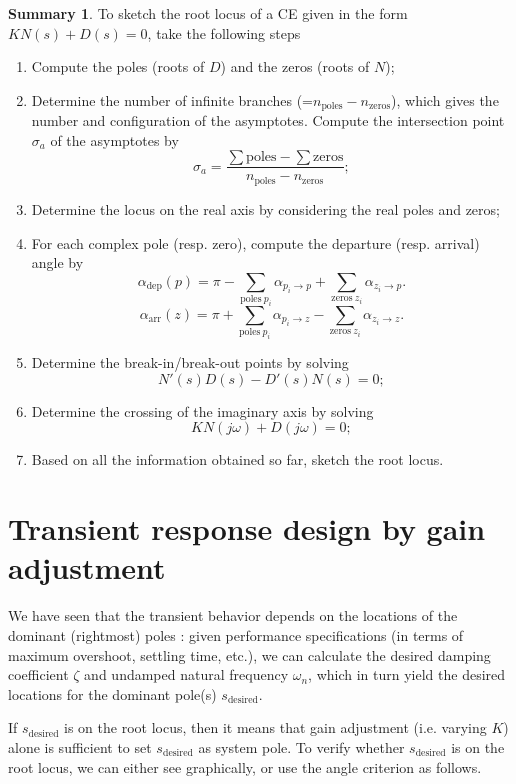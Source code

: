 \documentclass[a4paper,11pt]{report}
\theoremstyle{definition}
\newcommand{\des}{\textrm{desired}}
\newtheorem{mdsummary}{Summary}
\newenvironment{summary}%
  {\vspace{0.1cm}\begin{mdframed}[linecolor=red!60!black,
  linewidth=2pt]\begin{mdsummary}}%
  {\end{mdsummary}\end{mdframed}\vspace{0.1cm}}
\begin{document}
\begin{summary}
  To sketch the root locus of a CE given in the form $KN(s) + D(s) = 0$,
  take the following steps
  \begin{enumerate}
  \item Compute the poles (roots of $D$) and the zeros (roots of $N$);
  \item Determine the number of infinite branches (=$n_\textrm{poles} -
    n_\textrm{zeros}$), which gives the number and configuration of the
    asymptotes. Compute the intersection point $\sigma_a$ of the
    asymptotes by
    \[
    \sigma_a = \frac{\sum \textrm{poles}-\sum \textrm{zeros}}{n_\textrm{poles} -
    n_\textrm{zeros}};
    \]
  \item Determine the locus on the real axis by considering the real
    poles and zeros;
  \item For each complex pole (resp. zero), compute the departure
    (resp. arrival) angle by
    \[
    \alpha_\textrm{dep}(p) = \pi - \sum_{\textrm{poles}\ p_i} \alpha_{p_i \to p} +
    \sum_{\textrm{zeros}\ z_i} \alpha_{z_i \to p}.
    \]
    \[
    \alpha_\textrm{arr}(z) = \pi + \sum_{\textrm{poles}\ p_i} \alpha_{p_i \to z} -
    \sum_{\textrm{zeros}\ z_i} \alpha_{z_i \to z}.
    \]
  \item Determine the break-in/break-out points by solving
    \[
    N'(s)D(s)-D'(s)N(s)=0;
    \]
  \item Determine the crossing of the imaginary axis by solving
    \[
    KN(j\omega) + D(j\omega)=0;
    \]
  \item Based on all the information obtained so far, sketch the root
    locus.
  \end{enumerate}
\end{summary}



\section{Transient response design by gain adjustment}
\label{sec:gainadj}

We have seen that the transient behavior depends on the locations of
the dominant (rightmost) poles : given performance specifications (in
terms of maximum overshoot, settling time, etc.), we can calculate the
desired damping coefficient $\zeta$ and undamped natural frequency
$\omega_n$, which in turn yield the desired locations for the dominant
pole(s) $s_\des$.

If $s_\des$ is on the root locus, then it means that gain adjustment
(i.e. varying $K$) alone is sufficient to set $s_\des$ as system
pole. To verify whether $s_\des$ is on the root locus, we can either
see graphically, or use the angle criterion as follows.
\end{document}
